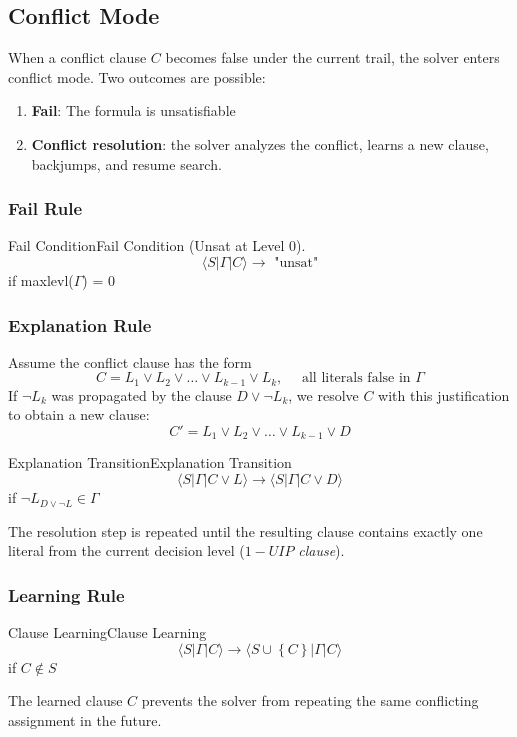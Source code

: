 \documentclass[a4paper]{article}
\theoremstyle{definition}
\begin{document}
\subsection{Conflict Mode}
When a conflict clause \( C \) becomes false under the current trail, the solver enters conflict mode. Two outcomes are possible:
\begin{enumerate}
  \item \textbf{Fail}: The formula is unsatisfiable 
  \item \textbf{Conflict resolution}: the solver analyzes the conflict, learns a new clause, backjumps, and resume search.
\end{enumerate}
\subsubsection{Fail Rule}
\begin{definition}{Fail Condition}{Fail Condition}
(Unsat at Level 0).
\[
  \langle S \vert \varGamma \vert C \rangle \rightarrow \text{ "unsat"}
\]
if maxlevl($\varGamma$) = 0 
\end{definition}
\subsubsection{Explanation Rule}
Assume the conflict clause has the form
\[
  C = L_1 \vee L_2 \vee \ldots \vee L_{k - 1} \vee L_k, \quad \text{ all literals false in } \varGamma
\]
If \( \lnot L_k \) was propagated by the clause \( D \vee \lnot L_k \), we resolve \( C \) with this justification to obtain a new clause:
\[
  C' = L_1 \vee L_2 \vee \ldots \vee L_{k - 1} \vee D
\]
\begin{definition}{Explanation Transition}{Explanation Transition}
\[
  \langle S \vert \varGamma \vert C \vee L \rangle \rightarrow \langle S \vert \varGamma \vert C \vee D \rangle
\]
if \( \lnot L_{D \vee \lnot L} \in \varGamma \)
\end{definition}
The resolution step is repeated until the resulting clause contains exactly one literal from the current 
decision level ($1-UIP$ \textit{clause}).
\subsubsection{Learning Rule}
\begin{definition}{Clause Learning}{Clause Learning}
\[
  \langle S \vert \varGamma \vert C \rangle \rightarrow \langle S \cup \left\{ C \right\} \vert \varGamma \vert C \rangle 
\]
if \( C \notin S \)
\end{definition}
The learned clause \( C \) prevents the solver from repeating the same conflicting assignment in the future.
\end{document}
